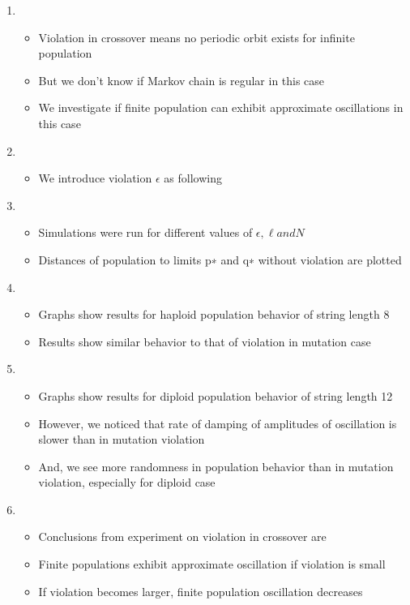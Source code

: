\documentclass{article}
\begin{document}
\begin{enumerate}
\item
  \begin{itemize}
  \item Violation in crossover means no periodic orbit exists for infinite population
  \item But we don't know if Markov chain is regular in this case
  \item We investigate if finite population can exhibit approximate oscillations in this case  
   
  \end{itemize}
  
\item
  \begin{itemize}
  \item We introduce violation $\epsilon$ as following  
  \end{itemize}
  
\item
  \begin{itemize}
  \item Simulations were run for different values of $\epsilon, \ell and N$
  \item Distances of population to limits p∗ and q∗ without violation are plotted  
  \end{itemize}
  
\item
  \begin{itemize}
  \item Graphs show results for haploid population behavior of string length 8
  \item Results show similar behavior to that of violation in mutation case
  \end{itemize}
  
\item 
  \begin{itemize}
  \item Graphs show results for diploid population behavior of string length 12
  \item However, we noticed that rate of damping of amplitudes of oscillation is slower than in mutation violation  
  \item And, we see more randomness in population behavior than in mutation violation, especially for diploid case
  \end{itemize}
  
\item
  \begin{itemize}
  \item Conclusions from experiment on violation in crossover are 
  \item Finite populations exhibit approximate oscillation if violation is small
  \item If violation becomes larger, finite population oscillation decreases
  \end{itemize}
  

\end{enumerate}
\end{document}
